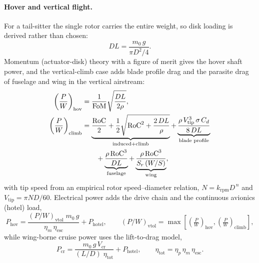 \paragraph{Hover and vertical flight.} For a tail-sitter the single
rotor carries the entire weight, so disk loading is derived rather than
chosen:
\begin{equation}
DL = \frac{m_0\,g}{\pi D^{2}/4}.
\label{eq:dl}
\end{equation}
Momentum (actuator-disk) theory with a figure of merit gives the hover
shaft power, and the vertical-climb case adds blade profile drag and
the parasite drag of fuselage and wing in the vertical airstream:
\begin{align}
\left(\frac{P}{W}\right)_{\mathrm{hov}}
  &= \frac{1}{\mathrm{FoM}}\sqrt{\frac{DL}{2\rho}},
  \label{eq:hover}\\
\left(\frac{P}{W}\right)_{\mathrm{climb}}
  &= \underbrace{\frac{\mathrm{RoC}}{2}
     + \frac{1}{2}\sqrt{\mathrm{RoC}^{2}+\frac{2\,DL}{\rho}}}
     _{\text{induced}+\text{climb}}
   + \underbrace{\frac{\rho\,V_{\mathrm{tip}}^{3}\,\sigma\,C_{d}}{8\,DL}}
     _{\text{blade profile}}
   \notag \\
  &\qquad
   + \underbrace{\frac{\rho\,\mathrm{RoC}^{3}}{DL}}_{\text{fuselage}}
   + \underbrace{\frac{\rho\,\mathrm{RoC}^{3}}{S_{r}\,(W/S)}}_{\text{wing}},
  \label{eq:vclimb}
\end{align}
with tip speed from an empirical rotor speed--diameter relation,
$N = k_{\mathrm{rpm}}D^{\,n}$ and
$V_{\mathrm{tip}} = \pi N D/60$. Electrical power adds the drive chain
and the continuous avionics (hotel) load,
\begin{equation}
P_{\mathrm{hov}}
  = \frac{(P/W)_{\mathrm{vtol}}\;m_0\,g}
         {\eta_m\,\eta_{\mathrm{esc}}} + P_{\mathrm{hotel}},
\qquad
(P/W)_{\mathrm{vtol}} = \max\!\left[
  \left(\tfrac{P}{W}\right)_{\mathrm{hov}},
  \left(\tfrac{P}{W}\right)_{\mathrm{climb}}\right],
\label{eq:phov}
\end{equation}
while wing-borne cruise power uses the lift-to-drag model,
\begin{equation}
P_{\mathrm{cr}} = \frac{m_0\,g\,V_{\mathrm{cr}}}{(L/D)\;\eta_{\mathrm{tot}}}
                  + P_{\mathrm{hotel}},
\qquad
\eta_{\mathrm{tot}} = \eta_p\,\eta_m\,\eta_{\mathrm{esc}}.
\label{eq:pcr}
\end{equation}

